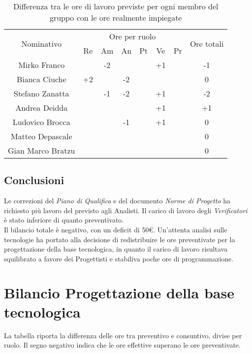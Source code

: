\begin{flushleft}
    \begin{table}[H]
	\begin{center}
		\begin{tabularx}{\textwidth}{|c|cccccc|c|}
			
			\hline
			\multirow{2}{*}{Nominativo} & \multicolumn{6}{c|}{Ore per ruolo} & \multirow{2}{*}{Ore totali} \\ \cline{2-7}
			& Re & Am & An & Pt & Ve & Pr &      \\ \hline
			\endhead
			Mirko Franco       &  & -2  & &  & +1 &   & -1   \\ \hline
			Bianca Ciuche      & +2 &    & -2 &    &  &   & 0   \\ \hline
			Stefano Zanatta    &   & -1 & -2 &  & +1 &  & -2    \\ \hline
			Andrea Deidda      &   &  &   &   & +1  &   & +1	\\ \hline
			Ludovico Brocca    &   &  & -1 &   & +1 &   & 0     \\ \hline
			Matteo Depascale   &   &  &   &   &   &   & 0  		\\ \hline
			Gian Marco Bratzu  &   &  &   &   &  &   & 0        \\ \hline
			
		\end{tabularx}
		\caption{Differenza tra le ore di lavoro previste per ogni membro del gruppo con le ore realmente impiegate }
	\end{center}
\end{table}

  \subsection{Conclusioni}
  Le correzioni del \textit{Piano di Qualifica} e del documento \textit{Norme di Progetto} ha richiesto più lavoro del previsto agli {Analisti}. Il carico di lavoro degli \textit{Verificatori} è stato inferiore di quanto preventivato.\\ Il bilancio totale è negativo, con un deficit di 50\euro.
  Un'attenta analisi sulle tecnologie ha portato alla decisione di redistribuire le ore preventivate per la progettazione della base tecnologica, in quanto il carico di lavoro risultava squilibrato a favore dei Progettisti e stabiliva poche ore di programmazione.

\newpage	
	\section{Bilancio Progettazione della base tecnologica} 
	\label{BilProgBT}
  La tabella riporta la differenza delle ore tra preventivo e consuntivo, divise per ruolo. Il segno negativo indica che le ore effettive superano le ore preventivate.
  

\end{flushleft}
